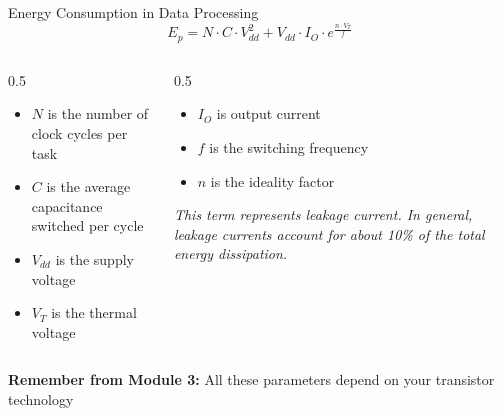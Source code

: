 \documentclass[aspectratio=169,11pt]{beamer}
\begin{document}
\begin{frame}{Energy Consumption in Data Processing}
    \[
    E_p = N \cdot C \cdot V_{dd}^2 + V_{dd} \cdot I_O \cdot e^{\frac{n \cdot V_T}{f}}
    \]
    
    \begin{columns}
        \begin{column}{0.5\textwidth}
            \begin{itemize}
                \item $N$ is the number of clock cycles per task
                \item $C$ is the average capacitance switched per cycle
                \item $V_{dd}$ is the supply voltage
                \item $V_T$ is the thermal voltage
            \end{itemize}
        \end{column}
        \begin{column}{0.5\textwidth}
            \begin{itemize}
                \item $I_O$ is output current
                \item $f$ is the switching frequency
                \item $n$ is the ideality factor
            \end{itemize}
            
            \vspace{0.3cm}
            \small
            \textit{This term represents leakage current. In general, leakage currents account for about 10\% of the total energy dissipation.}
        \end{column}
    \end{columns}
    
    \vspace{0.3cm}
    \textbf{Remember from Module 3:} All these parameters depend on your transistor technology
\end{frame}
\end{document}

